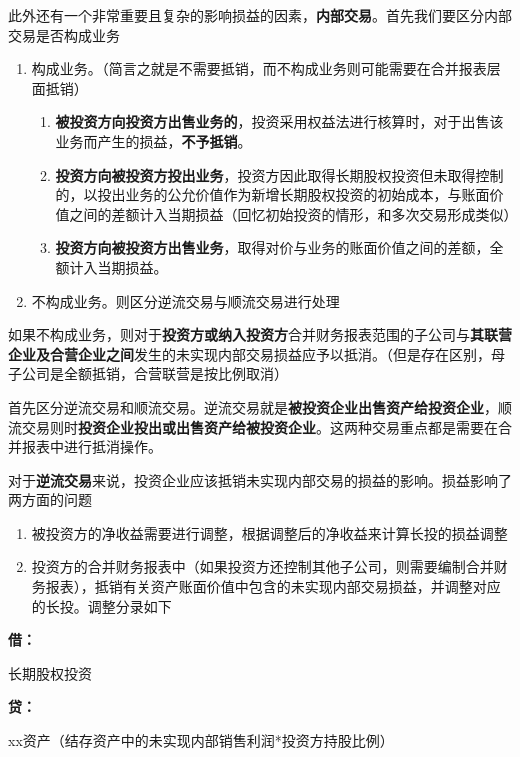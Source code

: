 \documentclass[UTF8,12pt]{ctexart}
\newenvironment{Dr}{%
	\begin{list}{}%
		{
			\setlength{\leftmargin}{2em}
			\setlength{\labelwidth}{2em}
			\setlength{\labelsep}{0pt}
			\setlength{\itemindent}{0pt}
			\setlength{\listparindent}{0pt}
			\setlength{\parsep}{0pt}
			\setlength{\topsep}{0pt}
		}
		\item[\textbf{借：}]
	}{%
	\end{list}
}
\newenvironment{Cr}{%
	\begin{list}{}%
		{
			\setlength{\leftmargin}{2em}
			\setlength{\labelwidth}{2em}
			\setlength{\labelsep}{0pt}
			\setlength{\itemindent}{0pt}
			\setlength{\listparindent}{0pt}
			\setlength{\parsep}{0pt}
			\setlength{\topsep}{0pt}
		}
		\item[\textbf{贷：}]
	}{%
	\end{list}
}
\numberwithin{equation}{section} %
\numberwithin{figure}{section}
\numberwithin{table}{section}
\begin{document}
	此外还有一个非常重要且复杂的影响损益的因素，\textbf{内部交易}。首先我们要区分内部交易是否构成业务
	\begin{enumerate}
		\item 构成业务。（简言之就是不需要抵销，而不构成业务则可能需要在合并报表层面抵销）
		\begin{enumerate}
			\item \textbf{被投资方向投资方出售业务的}，投资采用权益法进行核算时，对于出售该业务而产生的损益，\textbf{不予抵销}。
			
			\item \textbf{投资方向被投资方投出业务}，投资方因此取得长期股权投资但未取得控制的，以投出业务的公允价值作为新增长期股权投资的初始成本，与账面价值之间的差额计入当期损益（回忆初始投资的情形，和多次交易形成类似）
			
			\item \textbf{投资方向被投资方出售业务}，取得对价与业务的账面价值之间的差额，全额计入当期损益。
		\end{enumerate}
		
		\item 不构成业务。则区分逆流交易与顺流交易进行处理
	\end{enumerate}	
	
	如果不构成业务，则对于\textbf{投资方或纳入投资方}合并财务报表范围的子公司与\textbf{其联营企业及合营企业之间}发生的未实现内部交易损益应予以抵消。（但是存在区别，母子公司是全额抵销，合营联营是按比例取消）
	
	首先区分逆流交易和顺流交易。逆流交易就是\textbf{被投资企业出售资产给投资企业}，顺流交易则时\textbf{投资企业投出或出售资产给被投资企业}。这两种交易重点都是需要在合并报表中进行抵消操作。
	
	对于\textbf{逆流交易}来说，投资企业应该抵销未实现内部交易的损益的影响。损益影响了两方面的问题
	\begin{enumerate}
		\item 被投资方的净收益需要进行调整，根据调整后的净收益来计算长投的损益调整
		
		\item 投资方的合并财务报表中（如果投资方还控制其他子公司，则需要编制合并财务报表），抵销有关资产账面价值中包含的未实现内部交易损益，并调整对应的长投。调整分录如下
	\end{enumerate}
	
	\begin{Dr}
		长期股权投资
	\end{Dr}
	\begin{Cr}
		xx资产（结存资产中的未实现内部销售利润*投资方持股比例）
	\end{Cr}
	
\end{document}
